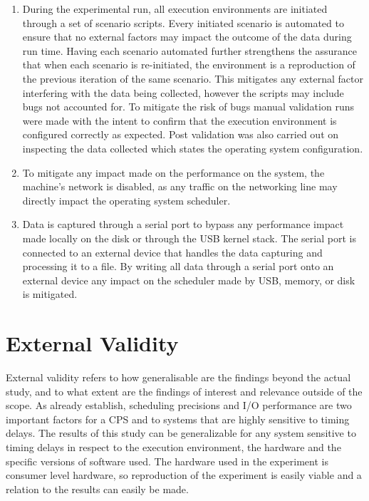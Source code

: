 \begin{enumerate}
\item{During the experimental run, all execution environments are initiated through a set of scenario scripts. Every initiated scenario is automated to ensure that no external factors may impact the outcome of the data during run time. Having each scenario automated further strengthens the assurance that when each scenario is re-initiated, the environment is a reproduction of the previous iteration of the same scenario. This mitigates any external factor interfering with the data being collected, however the scripts may include bugs not accounted for. To mitigate the risk of bugs manual validation runs were made with the intent to confirm that the execution environment is configured correctly as expected. Post validation was also carried out on inspecting the data collected which states the operating system configuration.}
\item{To mitigate any impact made on the performance on the system, the machine's network is disabled, as any traffic on the networking line may directly impact the operating system scheduler.}
\item{Data is captured through a serial port to bypass any performance impact made locally on the disk or through the USB kernel stack. The serial port is connected to an external device that handles the data capturing and processing it to a file. By writing all data through a serial port onto an external device any impact on the scheduler made by USB, memory, or disk is mitigated.}
\end{enumerate}

\section{External Validity}
External validity refers to how generalisable are the findings beyond the actual study, and to what extent are the findings of interest and relevance outside of the scope. As already establish, scheduling precisions and I/O performance are two important factors for a CPS and to systems that are highly sensitive to timing delays. The results of this study can be generalizable for any system sensitive to timing delays in respect to the execution environment, the hardware and the specific versions of software used. The hardware used in the experiment is consumer level hardware, so reproduction of the experiment is easily viable and a relation to the results can easily be made. 

